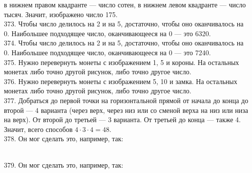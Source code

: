 \documentclass[12pt]{article}
\begin{document}
в нижнем правом квадранте --- число сотен, в нижнем левом квадранте --- число тысяч. Значит, изображено число 175.\\
373. Чтобы число делилось на 2 и на 5, достаточно, чтобы оно оканчивалось на 0. Наибольшее подходящее число, оканчивающееся на 0 --- это 6320.\\
374. Чтобы число делилось на 2 и на 5, достаточно, чтобы оно оканчивалось на 0. Наибольшее подходящее число, оканчивающееся на 0 --- это 7240.\\
375. Нужно перевернуть монеты с изображением 1, 5 и короны. На остальных монетах либо точно другой рисунок, либо точно другое число.\\
376. Нужно перевернуть монеты с изображением 5, 10 и замка. На остальных монетах либо точно другой рисунок, либо точно другое число.\\
377. Добраться до первой точки на горизонтальной прямой от начала до конца до второй --- 4 варианта (через верх, через низ или со сменой верха на низ или низа на верх). От второй до третьей --- 3 варианта. От третьей до конца --- также 4. Значит, всего способов $4\cdot3\cdot4=48.$\\
378. Он мог сделать это, например, так:
\begin{figure}[ht!]
\end{figure}\\
379. Он мог сделать это, например, так:
\end{document}
